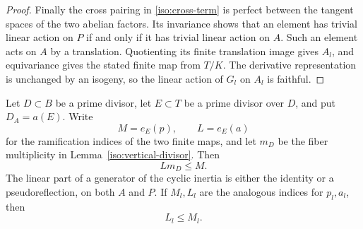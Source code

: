 \begin{proof}
Finally the cross pairing in \eqref{iso:cross-term} is perfect between
the tangent spaces of the two abelian factors.  Its invariance shows
that an element has trivial linear action on \(P\) if and only if it
has trivial linear action on \(A\).  Such an element acts on \(A\)
by a translation.  Quotienting its finite translation image gives
\(A_l\), and equivariance gives the stated finite map from \(T/K\).
The derivative representation is unchanged by an isogeny, so the
linear action of \(G_l\) on \(A_l\) is faithful.
\end{proof}

\begin{lemma}\label{iso:ramification}
Let \(D\subset B\) be a prime divisor, let \(E\subset T\) be a prime
divisor over \(D\), and put \(D_A=a(E)\).  Write
\[
                 M=e_E(p),\qquad L=e_E(a)
\]
for the ramification indices of the two finite maps, and let \(m_D\)
be the fiber multiplicity in Lemma~\ref{iso:vertical-divisor}.
Then
\begin{equation}\label{iso:multiplicity-bound}
                             Lm_D\le M.
\end{equation}
The linear part of a generator of the cyclic inertia is either the
identity or a pseudoreflection, on both \(A\) and \(P\).
If \(M_l,L_l\) are the analogous indices for \(p_l,a_l\), then
\begin{equation}\label{iso:linear-ramification-bound}
                              L_l\le M_l.
\end{equation}
\end{lemma}

